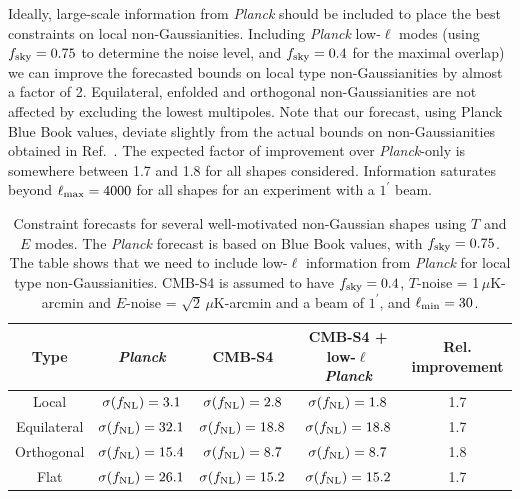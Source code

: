 Ideally, large-scale information from {\it Planck\/} \cite{Ade:2015ava} should be included to place the best constraints on local non-Gaussianities. Including {\it Planck\/} low-$\ell$ modes (using $f_{\rm sky} = 0.75$ \cite{Ade:2015ava} to determine the noise level, and $f_{\rm sky}=0.4$ for the maximal overlap) we can improve the forecasted bounds on local type non-Gaussianities by almost a factor of 2. Equilateral, enfolded and orthogonal non-Gaussianities are not affected by excluding the lowest multipoles. Note that our forecast, using Planck Blue Book\cite{Planck:2006aa}
values, deviate slightly from the actual bounds on non-Gaussianities obtained in Ref.~\cite{Ade:2015ava}. The expected factor of improvement over {\it Planck}-only is somewhere between 1.7 and 1.8 for all shapes considered. Information saturates beyond $\ell_{\rm max} = 4000$ for all shapes for an experiment with a $1^\prime$ beam. 

\begin{table}[t]
  \begin{center}
    \begin{tabular}{ | c || c | c | c | c |}
      \hline
      Type & {\it Planck} & CMB-S4 & CMB-S4 + low-$\ell$ {\it Planck} & Rel. improvement \\ \hline \hline
      Local & $\sigma(f_{\rm NL}) = 3.1$ & $\sigma(f_{\rm NL}) = 2.8$ &  $\sigma(f_{\rm NL}) = 1.8$ & 1.7\\ \hline 
      Equilateral &  $\sigma(f_{\rm NL}) = 32.1$ & $\sigma(f_{\rm NL}) = 18.8$ &  $\sigma(f_{\rm NL}) = 18.8$ & 1.7\\ \hline 
      Orthogonal &  $\sigma(f_{\rm NL}) = 15.4$ & $\sigma(f_{\rm NL}) = 8.7$ &  $\sigma(f_{\rm NL}) = 8.7$ & 1.8\\ \hline 
      Flat &  $\sigma(f_{\rm NL}) = 26.1$ & $\sigma(f_{\rm NL}) = 15.2$ &  $\sigma(f_{\rm NL}) = 15.2$ & 1.7\\ \hline 
    \end{tabular}
  \end{center}
  \caption{Constraint forecasts for several well-motivated non-Gaussian shapes using $T$ and $E$ modes. The {\it Planck\/} forecast is based on Blue Book values, with $f_{\rm sky} = 0.75$. The table shows that we need to include low-$\ell$ information from {\it Planck\/} for local type non-Gaussianities. CMB-S4 is assumed to have $f_{\rm sky} = 0.4$, $T$-noise = 1$\,\mu$K-arcmin and $E$-noise = $\sqrt{2}\,\mu$K-arcmin and a beam of $1^\prime$, and $\ell_{\rm min} = 30$.}
  \label{tab:fnl_forecast}
\end{table}

